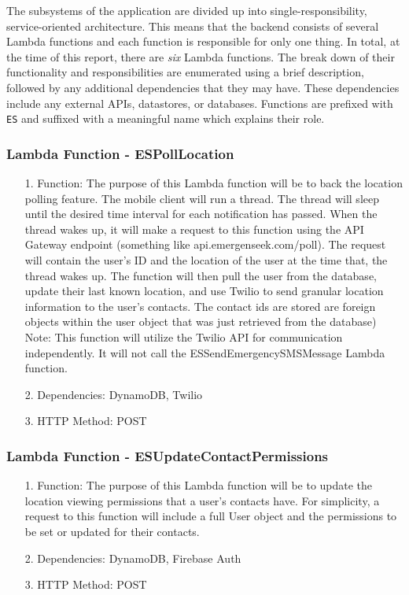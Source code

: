 \documentclass[10pt, a4paper]{article}
\begin{document}
The subsystems of the application are divided up into single-responsibility, service-oriented architecture. This means that the backend consists of several Lambda functions and each function is responsible for only one thing. In total, at the time of this report, there are \emph{six} Lambda functions. The break down of their functionality and responsibilities are enumerated using a brief description, followed by any additional dependencies that they may have. These dependencies include any external APIs, datastores, or databases. Functions are prefixed with \texttt{ES} and suffixed with a meaningful name which explains their role.

\subsubsection{Lambda Function - ESPollLocation}
\begin{enumerate}
	\item[1.] Function: The purpose of this Lambda function will be to back the location polling feature. The mobile client will run a thread. The thread will sleep until the desired time interval for each notification has passed. When the thread wakes up, it will make a request to this function using the API Gateway endpoint (something like api.emergenseek.com/poll). The request will contain the user's ID and the location of the user at the time that, the thread wakes up. The function will then pull the user from the database, update their last known location, and use Twilio to send granular location information to the user's contacts. The contact ids are stored are foreign objects within the user object that was just retrieved from the database) Note: This function will utilize the Twilio API for communication independently. It will not call the ESSendEmergencySMSMessage Lambda function.
	\item[2.] Dependencies: DynamoDB, Twilio
	\item[3.] HTTP Method: POST
\end{enumerate}
	
\subsubsection{Lambda Function - ESUpdateContactPermissions}
\begin{enumerate}
	\item[1.] Function: The purpose of this Lambda function will be to update the location viewing permissions that  a user's contacts have. For simplicity, a request to this function will include a full User object and the permissions to be set or updated for their contacts.
	\item[2.] Dependencies: DynamoDB, Firebase Auth
	\item[3.] HTTP Method: POST
\end{enumerate}
\end{document}
